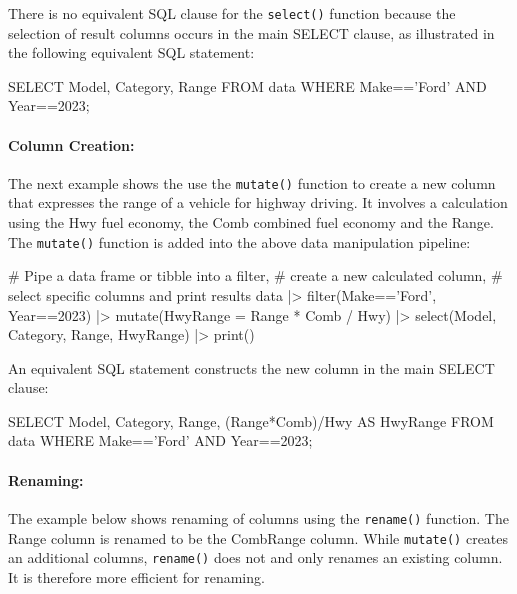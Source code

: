 There is no equivalent SQL clause for the \texttt{select()} function because the selection of result columns occurs in the main SELECT clause, as illustrated in the following equivalent SQL statement:

\begin{samepage}
\begin{sqlcode}
SELECT Model, Category, Range 
   FROM data 
   WHERE Make=='Ford' AND Year==2023;
\end{sqlcode}
\end{samepage}

\paragraph*{Column Creation:} The next example shows the use the \texttt{mutate()} function to create a new column that expresses the range of a vehicle for highway driving. It involves a calculation using the Hwy fuel economy, the Comb combined fuel economy and the Range. The \texttt{mutate()} function is added into the above data manipulation pipeline:

\begin{samepage}
\begin{Rcode}
# Pipe a data frame or tibble into a filter,
# create a new calculated column,
# select specific columns and print results
data |> 
  filter(Make=='Ford', Year==2023) |> 
  mutate(HwyRange = Range * Comb / Hwy) |>
  select(Model, Category, Range, HwyRange) |>
  print()
\end{Rcode}
\end{samepage}

An equivalent SQL statement constructs the new column in the main SELECT clause:

\begin{samepage}
\begin{sqlcode}
SELECT Model, Category, Range, (Range*Comb)/Hwy AS HwyRange 
   FROM data 
   WHERE Make=='Ford' AND Year==2023;
\end{sqlcode}
\end{samepage}

\paragraph*{Renaming:} The example below shows renaming of columns using the \texttt{rename()} function. The Range column is renamed to be the CombRange column. While \texttt{mutate()} creates an additional columns, \texttt{rename()} does not and only renames an existing column. It is therefore more efficient for renaming.

